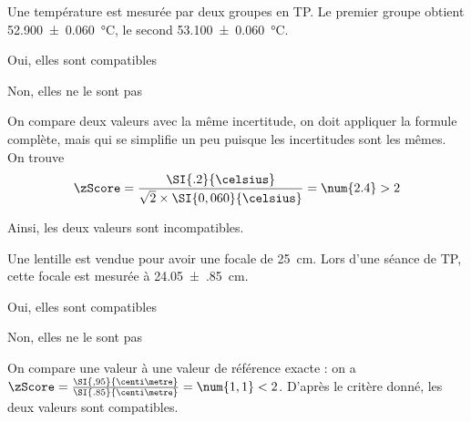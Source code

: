 


  \begin{enonce}
  Une température est mesurée par deux groupes en TP. Le premier groupe obtient \SI{52.900\pm 0,060}{\celsius}, le second  \SI{53.100\pm 0,060}{\celsius}. 
  \begin{listeQCM2Colonnes}
    \item Oui, elles sont compatibles
    \item Non, elles ne le sont pas
  \end{listeQCM2Colonnes}
  \end{enonce}
  
  \reponse{\reponseB{}}
  
  \begin{corrige}
    On compare deux valeurs avec la même incertitude, on doit appliquer la formule complète, mais qui se simplifie un peu puisque les incertitudes sont les mêmes. On trouve
      \[
    \zScore=\frac{\SI{.2}{\celsius}}{\sqrt{2}\times \SI{0,060}{\celsius}}=\num{2.4}>2
    \]
    
    Ainsi, les deux valeurs sont incompatibles.
  \end{corrige}
  



\begin{enonce}
  Une lentille est vendue pour avoir une focale de \SI{25}{\centi\metre}. Lors d'une séance de TP, cette focale est mesurée à \SI{24.05\pm ,85}{\centi\metre}.
  \begin{listeQCM2Colonnes}
    \item Oui, elles sont compatibles
    \item Non, elles ne le sont pas
  \end{listeQCM2Colonnes}
 \end{enonce} 
 
  \reponse{\reponseA{}}
  
  \begin{corrige}
    On compare une valeur à une valeur de référence exacte : on a \(\zScore=\frac{\SI{,95}{\centi\metre}}{\SI{.85}{\centi\metre}}=\num{1,1}<2\).
    D'après le critère donné, les deux valeurs sont compatibles.
  \end{corrige}
  
